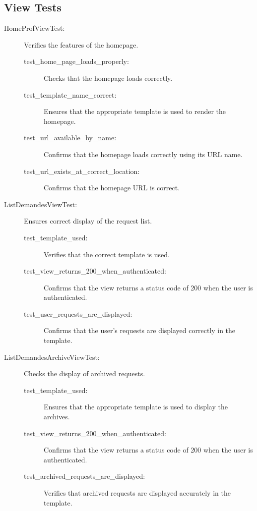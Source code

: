 \documentclass[12pt]{article}
\begin{document}
\subsection{View Tests}

\begin{description}
  \item[HomeProfViewTest:] Verifies the features of the homepage.
  \begin{description}
    \item[test\_home\_page\_loads\_properly:] Checks that the homepage loads correctly.
    \item[test\_template\_name\_correct:] Ensures that the appropriate template is used to render the homepage.
    \item[test\_url\_available\_by\_name:] Confirms that the homepage loads correctly using its URL name.
    \item[test\_url\_exists\_at\_correct\_location:] Confirms that the homepage URL is correct.
  \end{description}
  
  \item[ListDemandesViewTest:] Ensures correct display of the request list.
  \begin{description}
    \item[test\_template\_used:] Verifies that the correct template is used.
    \item[test\_view\_returns\_200\_when\_authenticated:] Confirms that the view returns a status code of 200 when the user is authenticated.
    \item[test\_user\_requests\_are\_displayed:] Confirms that the user's requests are displayed correctly in the template.
  \end{description}

  \item[ListDemandesArchiveViewTest:] Checks the display of archived requests.
  \begin{description}
    \item[test\_template\_used:] Ensures that the appropriate template is used to display the archives.
    \item[test\_view\_returns\_200\_when\_authenticated:] Confirms that the view returns a status code of 200 when the user is authenticated.
    \item[test\_archived\_requests\_are\_displayed:] Verifies that archived requests are displayed accurately in the template.
  \end{description}


\end{description}
\end{document}
